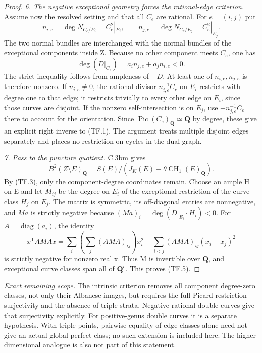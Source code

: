 \begin{proof}
\emph{6. The negative exceptional geometry forces the rational-edge
criterion.}
Assume now the resolved setting and that all $C_e$ are rational.
For $e=(i,j)$ put
\[
 n_{i,e}=\deg N_{C_e/E_i}=C_e^2|_{E_i},\qquad
 n_{j,e}=\deg N_{C_e/E_j}=C_e^2|_{E_j}.
\]
The two normal bundles are interchanged with the normal bundles
of the exceptional components inside Z. Because no other
component meets $C_e$, one has
\begin{equation}
              \deg(D|_{C_e})=a_i n_{j,e}+a_j n_{i,e}<0.
                                                               \tag{TF.10}
\end{equation}
The strict inequality follows from ampleness of $-D$.
At least one of $n_{i,e},n_{j,e}$ is therefore nonzero.
If $n_{i,e}\ne0$, the rational divisor
$n_{i,e}^{-1}C_e$ on $E_i$ restricts with degree one to that edge;
it restricts trivially to every other edge on $E_i$, since those
curves are disjoint. If the nonzero self-intersection is on
$E_j$, use $-n_{j,e}^{-1}C_e$ there to account for the orientation.
Since $\operatorname{Pic}(C_e)_{\mathbf Q}\simeq\mathbf Q$ by
degree, these give an explicit right inverse to (TF.1).
The argument treats multiple disjoint edges separately and places
no restriction on cycles in the dual graph.

\emph{7. Pass to the puncture quotient.}
C.3bm gives
\[
 B^2(Z\setminus E)_{\mathbf Q}
   =S(E)/(J_K(E)+\theta\operatorname{CH}_1(E)_{\mathbf Q}).
\]
By (TF.3), only the component-degree coordinates remain.
Choose an ample H on E and let $M_{ij}$ be the degree on $E_i$
of the exceptional restriction of the curve class $H_j$ on $E_j$.
The matrix is symmetric, its off-diagonal entries are nonnegative,
and $Ma$ is strictly negative because
$(Ma)_i=\deg(D|_{E_i}\cdot H_i)<0$.
For $A=\operatorname{diag}(a_i)$, the identity
\[
 x^{\mathsf T}AMA x
  =\sum_i\left(\sum_j(AMA)_{ij}\right)x_i^2
       -\sum_{i<j}(AMA)_{ij}(x_i-x_j)^2
\]
is strictly negative for nonzero real x. Thus M is invertible
over $\mathbf Q$, and exceptional curve classes span all of
$\mathbf Q^c$. This proves (TF.5).
\end{proof}

\emph{Exact remaining scope.}
The intrinsic criterion removes all component degree-zero classes,
not only their Albanese images, but requires the full Picard
restriction surjectivity and the absence of triple strata.
Negative rational double curves give that surjectivity explicitly.
For positive-genus double curves it is a separate hypothesis.
With triple points, pairwise equality of edge classes alone need
not give an actual global perfect class; no such extension is
included here. The higher-dimensional analogue is also not part
of this statement.
